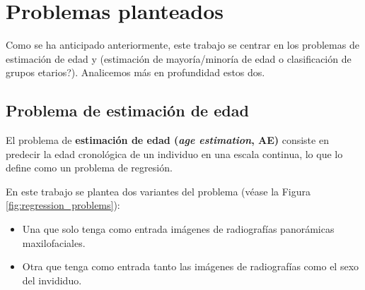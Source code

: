 
\section{Problemas planteados}

Como se ha anticipado anteriormente, este trabajo se centrar en los problemas de estimación de edad y 
(estimación de mayoría/minoría de edad o clasificación de grupos etarios?).
Analicemos más en profundidad estos dos. 


\subsection{Problema de estimación de edad}


El problema de \textbf{estimación de edad (\textit{age estimation}, AE)} consiste en predecir la edad 
cronológica de un individuo en una escala continua, lo que lo define como un problema de regresión.

En este trabajo se plantea dos variantes del problema (véase la Figura \ref{fig:regression_problems}): 
\begin{itemize}
    \item Una que solo tenga como entrada imágenes de radiografías panorámicas maxilofaciales.
    \item Otra que tenga como entrada tanto las imágenes de radiografías como el sexo del invididuo. 
\end{itemize}


